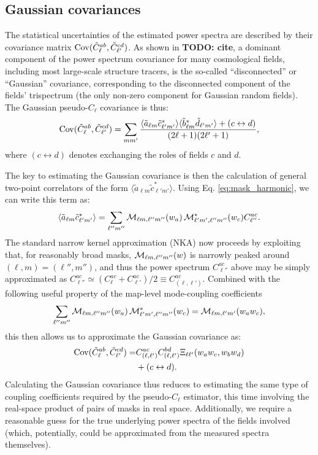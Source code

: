 \documentclass[aps,twocolumn, superscriptaddress, english, nofootinbib, 10pt]{revtex4-2}
\newcommand{\todo}[1]{{\color{blue}\bf TODO: #1}}
\begin{document}
  \subsection{Gaussian covariances}\label{ssec:pcls.cov}
    The statistical uncertainties of the estimated power spectra are described by their covariance matrix ${\rm Cov}(\tilde{C}^{ab}_\ell,\tilde{C}^{cd}_{\ell'})$. As shown in \todo{cite}, a dominant component of the power spectrum covariance for many cosmological fields, including most large-scale structure tracers, is the so-called ``disconnected'' or ``Gaussian'' covariance, corresponding to the disconnected component of the fields' trispectrum (the only non-zero component for Gaussian random fields). The Gaussian pseudo-$C_\ell$ covariance is thus:
    \begin{equation}\nonumber
      {\rm Cov}(\tilde{C}^{ab}_\ell,\tilde{C}^{cd}_{\ell'})=\sum_{mm'}\frac{\langle \tilde{a}_{\ell m}\tilde{c}_{\ell'm'}^*\rangle\langle \tilde{b}^*_{\ell m}\tilde{d}_{\ell'm'}\rangle+(c\leftrightarrow d)}{(2\ell+1)(2\ell'+1)},
    \end{equation}
    where $(c\leftrightarrow d)$ denotes exchanging the roles of fields $c$ and $d$. 
    
    The key to estimating the Gaussian covariance is then the calculation of general two-point correlators of the form $\langle\tilde{a}_{\ell m}\tilde{c}_{\ell'm'}^*\rangle$. Using Eq. \ref{eq:mask_harmonic}, we can write this term as:
    \begin{equation}\label{eq:general_2pt}
      \langle\tilde{a}_{\ell m}\tilde{c}_{\ell'm'}^*\rangle=
      \sum_{\ell''m''}{\cal M}_{\ell m,\ell''m''}(w_a)\,{\cal M}^{*}_{\ell' m',\ell''m''}(w_c)C_{\ell''}^{ac}.
    \end{equation}
    The standard narrow kernel approximation (NKA) now proceeds by exploiting that, for reasonably broad masks, ${\cal M}_{\ell m,\ell''m''}(w)$ is narrowly peaked around $(\ell,m)=(\ell'',m'')$, and thus the power spectrum $C^{ac}_{\ell''}$ above may be simply approximated as $C^{ac}_{\ell''}\simeq(C^{ac}_\ell+C^{ac}_{\ell'})/2\equiv C^{ac}_{(\ell,\ell')}$. Combined with the following useful property of the map-level mode-coupling coefficients
    \begin{equation}
      \sum_{\ell''m''}{\cal M}_{\ell m,\ell''m''}(w_a)\,{\cal M}^{*}_{\ell' m',\ell''m''}(w_c)={\cal M}_{\ell m,\ell'm'}(w_aw_c),
    \end{equation}
    this then allows us to approximate the Gaussian covariance as:
    \begin{align}\nonumber
      {\rm Cov}(\tilde{C}^{ab}_\ell,\tilde{C}^{cd}_{\ell'})=
      &C^{ac}_{(\ell,\ell')}C^{bd}_{(\ell,\ell')}\Xi_{\ell\ell'}(w_aw_c,w_bw_d)\\\label{eq:nka_simple}
      &+(c\leftrightarrow d).
    \end{align}
    Calculating the Gaussian covariance thus reduces to estimating the same type of coupling coefficients required by the pseudo-$C_\ell$ estimator, this time involving the real-space product of pairs of masks in real space. Additionally, we require a reasonable guess for the true underlying power spectra of the fields involved (which, potentially, could be approximated from the measured spectra themselves).
\end{document}
